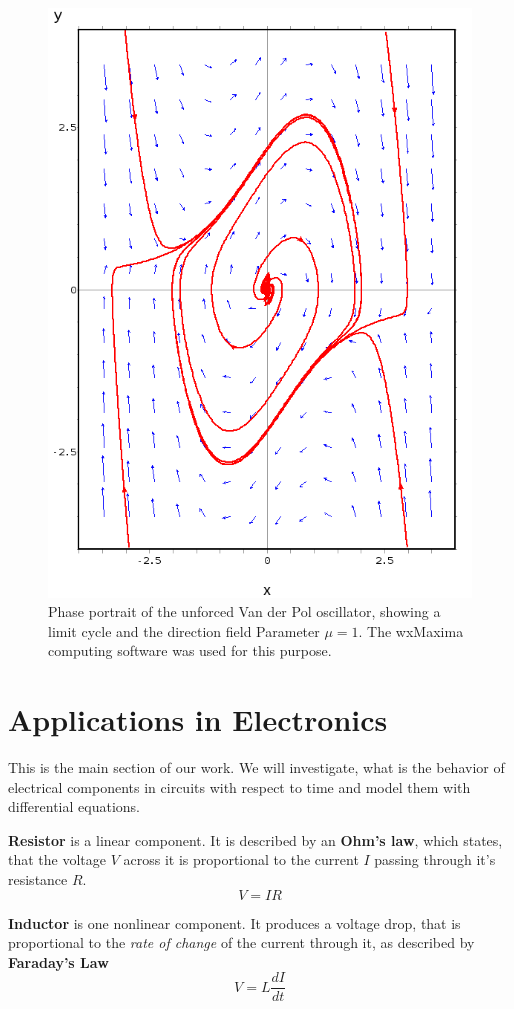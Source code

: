 \documentclass[journal]{IEEEtran}
\begin{document}
\begin{figure}[ht!]
	\centering
	\includegraphics[width=.85\linewidth]{vdp_maxima}
	\caption{Phase portrait of the unforced Van der Pol oscillator, showing a limit cycle and the direction field Parameter $\mu=1$. The wxMaxima computing software was used for this purpose. }
	\label{f:vdp_m}
\end{figure}


\section{Applications in Electronics}
This is the main section of our work. We will investigate, what is the behavior of electrical components in circuits with respect to time and model them with differential equations.

\textbf{Resistor} is a linear component. It is described by an \textbf{Ohm's law}, which states, that the voltage $V$ across it is proportional to the current $I$ passing through it's resistance $R$.
$$V=IR$$

\textbf{Inductor} is one nonlinear component. It produces a voltage drop, that is proportional to the \textit{rate of change} of the current through it, as described by \textbf{Faraday's Law}
$$V=L\frac{dI}{dt}$$
\end{document}
